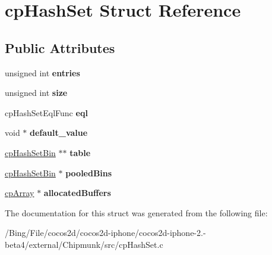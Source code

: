 \hypertarget{structcp_hash_set}{\section{cp\-Hash\-Set Struct Reference}
\label{structcp_hash_set}
}
\subsection*{Public Attributes}
\begin{DoxyCompactItemize}
\item 
\hypertarget{structcp_hash_set_a844610dbc992a1923a0f6a236460016c}{unsigned int {\bfseries entries}}\label{structcp_hash_set_a844610dbc992a1923a0f6a236460016c}

\item 
\hypertarget{structcp_hash_set_ab4b1322d2480accf2162bbe4c2f80e0b}{unsigned int {\bfseries size}}\label{structcp_hash_set_ab4b1322d2480accf2162bbe4c2f80e0b}

\item 
\hypertarget{structcp_hash_set_ae6ce626b59c18cb3836b41de4eafbc24}{cp\-Hash\-Set\-Eql\-Func {\bfseries eql}}\label{structcp_hash_set_ae6ce626b59c18cb3836b41de4eafbc24}

\item 
\hypertarget{structcp_hash_set_a5a2ff9d05fe973c2bc5b20144b3efc72}{void $\ast$ {\bfseries default\-\_\-value}}\label{structcp_hash_set_a5a2ff9d05fe973c2bc5b20144b3efc72}

\item 
\hypertarget{structcp_hash_set_a05924795153686286a42c1421efad0a2}{\hyperlink{structcp_hash_set_bin}{cp\-Hash\-Set\-Bin} $\ast$$\ast$ {\bfseries table}}\label{structcp_hash_set_a05924795153686286a42c1421efad0a2}

\item 
\hypertarget{structcp_hash_set_a67da221cb68336704222e75fabbdffa3}{\hyperlink{structcp_hash_set_bin}{cp\-Hash\-Set\-Bin} $\ast$ {\bfseries pooled\-Bins}}\label{structcp_hash_set_a67da221cb68336704222e75fabbdffa3}

\item 
\hypertarget{structcp_hash_set_afd3005262937a7b1a9ecf9f9322ee138}{\hyperlink{structcp_array}{cp\-Array} $\ast$ {\bfseries allocated\-Buffers}}\label{structcp_hash_set_afd3005262937a7b1a9ecf9f9322ee138}

\end{DoxyCompactItemize}


The documentation for this struct was generated from the following file\-:\begin{DoxyCompactItemize}
\item 
/\-Bing/\-File/cocos2d/cocos2d-\/iphone/cocos2d-\/iphone-\/2.-\/beta4/external/\-Chipmunk/src/cp\-Hash\-Set.\-c\end{DoxyCompactItemize}

